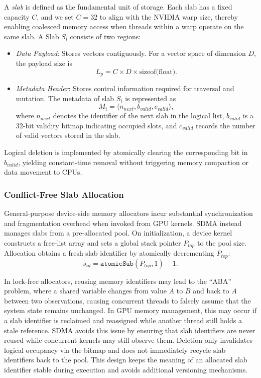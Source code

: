 \documentclass[sigconf,nonacm]{acmart}
\theoremstyle{plain}
\theoremstyle{definition}
\theoremstyle{remark}
\begin{document}
A \emph{slab} is defined as the fundamental unit of storage. Each slab has a fixed capacity $C$, and we set $C = 32$ to align with the NVIDIA warp size, thereby enabling coalesced memory access when threads within a warp operate on the same slab. A Slab $S_i$ consists of two regions:

\begin{itemize}
    \item \textit{Data Payload}: Stores vectors contiguously. For a vector space of dimension $D$, the payload size is
    \[
        L_p = C \times D \times \text{sizeof(float)}.
    \]

    \item \textit{Metadata Header}: Stores control information required for traversal and mutation. The metadata of slab $S_i$ is represented as
    \begin{equation}
        M_i = \langle n_{next}, b_{valid}, c_{valid} \rangle,
    \end{equation}
    where $n_{next}$ denotes the identifier of the next slab in the logical list, $b_{valid}$ is a 32-bit validity bitmap indicating occupied slots, and $c_{valid}$ records the number of valid vectors stored in the slab.
\end{itemize}

Logical deletion is implemented by atomically clearing the corresponding bit in $b_{valid}$, yielding constant-time removal without triggering memory compaction or data movement to CPUs.

\subsubsection{Conflict-Free Slab Allocation}

General-purpose device-side memory allocators incur substantial synchronization and fragmentation overhead when invoked from GPU kernels. SDMA instead manages slabs from a pre-allocated pool. On initialization, a device kernel constructs a free-list array and sets a global stack pointer $P_{top}$ to the pool size. Allocation obtains a fresh slab identifier by atomically decrementing $P_{top}$:
\begin{equation}
    s_{id} = \texttt{atomicSub}(P_{top}, 1) - 1.
\end{equation}

In lock-free allocators, reusing memory identifiers may lead to the ``ABA'' problem, where a shared variable changes from value $A$ to $B$ and back to $A$ between two observations, causing concurrent threads to falsely assume that the system state remains unchanged. In GPU memory management, this may occur if a slab identifier is reclaimed and reassigned while another thread still holds a stale reference.
SDMA avoids this issue by ensuring that slab identifiers are never reused while concurrent kernels may still observe them. Deletion only invalidates logical occupancy via the bitmap and does not immediately recycle slab identifiers back to the pool. This design keeps the meaning of an allocated slab identifier stable during execution and avoids additional versioning mechanisms.
\end{document}
